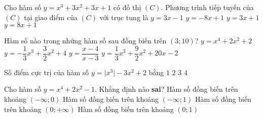 \begin{ex}%
	Cho hàm số $y=x^3+3x^2+3x+1$ có đồ thị $(C)$. Phương trình tiếp tuyến của $(C)$ tại giao điểm của $(C)$ với trục tung là
	\choice
	{$y=3x-1$}
	{$y=-8x+1$}
	{\True $y=3x+1$}
	{$y=8x+1$}
\end{ex}

\begin{ex}%
	Hàm số nào trong nhứng hàm số sau đồng biến trên $(3;10)$?
	\choice
	{$y=x^4+2x^2+2$}
	{$y=-\dfrac{1}{3}x^3+\dfrac{3}{2}x^2+4$}
	{$y=\dfrac{x-4}{x-3}$}
	{\True $y=\dfrac{1}{3}x^3+\dfrac{9}{2}x^2+20x-2$}
\end{ex}

\begin{ex}%
	Số điểm cực trị của hàm số $y=\vert x^3\vert -3x^2+2$ bằng
	\choice
	{$1$}
	{$2$}
	{\True $3$}
	{$4$}
\end{ex}

\begin{ex}%
	Cho hàm số $y=x^4+2x^2-1$. Khẳng định nào {\bf sai}?
	\choice
	{Hàm số đồng biến trên khoảng $(-\infty;0)$}
	{Hàm số đồng biến trên khoảng $(-\infty;1)$}
	{\True Hàm số đồng biến trên khoảng $(0;+\infty)$}
	{Hàm số đồng biến trên khoảng $(0;1)$}
\end{ex}

